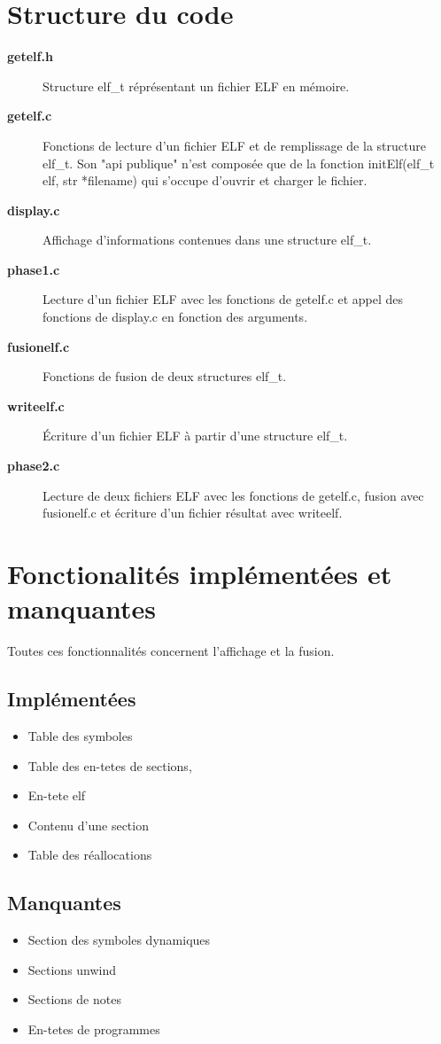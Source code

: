 \documentclass[10pt,oneside]{article}   %
\begin{document}
\section{Structure du code}
	\begin{description}
		\item [\bf{getelf.h}] Structure elf\_t réprésentant un fichier ELF en mémoire.
		\item [\bf{getelf.c}] Fonctions de lecture d'un fichier ELF et de remplissage de la structure elf\_t. Son "api publique" n'est composée que de la fonction initElf(elf\_t elf, str *filename) qui s'occupe d'ouvrir et charger le fichier.
		\item [\bf{display.c}] Affichage d'informations contenues dans une structure elf\_t.
		\item [\bf{phase1.c}] Lecture d'un fichier ELF avec les fonctions de getelf.c et appel des fonctions de display.c en fonction des arguments.
		\item [\bf{fusionelf.c}] Fonctions de fusion de deux structures elf\_t.
		\item [\bf{writeelf.c}] Écriture d'un fichier ELF à partir d'une structure elf\_t.
		\item [\bf{phase2.c}] Lecture de deux fichiers ELF avec les fonctions de getelf.c, fusion avec fusionelf.c et écriture d'un fichier résultat avec writeelf.
	\end{description}


\section{Fonctionalités implémentées et manquantes}
	Toutes ces fonctionnalités concernent l'affichage et la fusion.
	\subsection{Implémentées}
		\begin{itemize}
			\item Table des symboles
			\item Table des en-tetes de sections,
			\item En-tete elf
			\item Contenu d'une section
			\item Table des réallocations
		\end{itemize}
	\subsection{Manquantes}
		\begin{itemize}
			\item Section des symboles dynamiques
			\item Sections unwind
			\item Sections de notes
			\item En-tetes de programmes
		\end{itemize}
\end{document}

